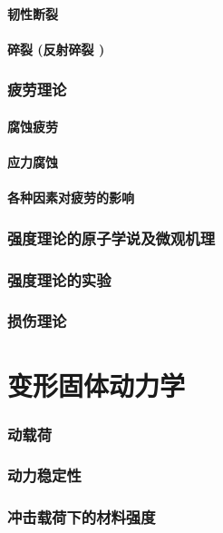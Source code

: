 \documentclass[UTF8]{../../06-Physics}
\begin{document}
        \subsubsection{韧性断裂}
        \subsubsection{碎裂 (反射碎裂 )}

    \subsection{疲劳理论}
        \subsubsection{腐蚀疲劳}
        \subsubsection{应力腐蚀}
        \subsubsection{各种因素对疲劳的影响}

    \subsection{强度理论的原子学说及微观机理}
    \subsection{强度理论的实验}
    \subsection{损伤理论}



\chapter{变形固体动力学}
    \subsection{动载荷}
    \subsection{动力稳定性}
    \subsection{冲击载荷下的材料强度}
\end{document}
